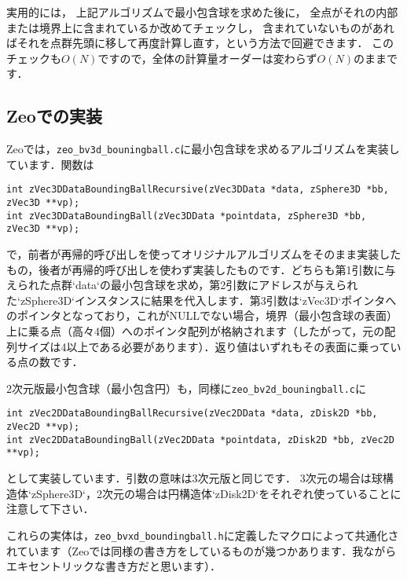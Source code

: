 ﻿\documentclass[a4paper]{jsarticle}
\begin{document}
実用的には，
上記アルゴリズムで最小包含球を求めた後に，
全点がそれの内部または境界上に含まれているか改めてチェックし，
含まれていないものがあればそれを点群先頭に移して再度計算し直す，という方法で回避できます．
このチェックも$O(N)$ですので，全体の計算量オーダーは変わらず$O(N)$のままです．

\subsection{Zeoでの実装}

Zeoでは，\verb|zeo_bv3d_bouningball.c|に最小包含球を求めるアルゴリズムを実装しています．関数は
\begin{screen}
\begin{verbatim}
int zVec3DDataBoundingBallRecursive(zVec3DData *data, zSphere3D *bb, zVec3D **vp);
int zVec3DDataBoundingBall(zVec3DData *pointdata, zSphere3D *bb, zVec3D **vp);
\end{verbatim}
\end{screen}
で，前者が再帰的呼び出しを使ってオリジナルアルゴリズムをそのまま実装したもの，後者が再帰的呼び出しを使わず実装したものです．どちらも第1引数に与えられた点群`data`の最小包含球を求め，第2引数にアドレスが与えられた`zSphere3D`インスタンスに結果を代入します．第3引数は`zVec3D`ポインタへのポインタとなっており，これがNULLでない場合，境界（最小包含球の表面）上に乗る点（高々4個）へのポインタ配列が格納されます（したがって，元の配列サイズは4以上である必要があります）．返り値はいずれもその表面に乗っている点の数です．

2次元版最小包含球（最小包含円）も，同様に\verb|zeo_bv2d_bouningball.c|に
\begin{screen}
\begin{verbatim}
int zVec2DDataBoundingBallRecursive(zVec2DData *data, zDisk2D *bb, zVec2D **vp);
int zVec2DDataBoundingBall(zVec2DData *pointdata, zDisk2D *bb, zVec2D **vp);
\end{verbatim}
\end{screen}
として実装しています．引数の意味は3次元版と同じです．
3次元の場合は球構造体`zSphere3D`，2次元の場合は円構造体`zDisk2D`をそれぞれ使っていることに注意して下さい．

これらの実体は，\verb|zeo_bvxd_boundingball.h|に定義したマクロによって共通化されています（Zeoでは同様の書き方をしているものが幾つかあります．我ながらエキセントリックな書き方だと思います）．
\end{document}
